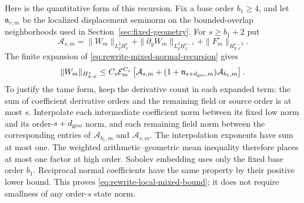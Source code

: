 Here is the quantitative form of this recursion. Fix a base order
$b_1\ge4$, and let $\mathfrak n_{r,m}$ be the localized displacement
seminorm on the bounded-overlap neighborhoods used in
Section~\ref{sec:fixed-geometry}. For $s\ge b_1+2$ put
\[
 \mathcal A_{s,m}
 =\|W_m\|_{L_y^2H_\varphi^s}
   +\|\partial_yW_m\|_{L_y^2H_\varphi^{s-1}}
   +\|F_m^\circ\|_{H^{s-2}_{y,\varphi}}.
\]
The finite expansion of \eqref{eq:rewrite-mixed-normal-recursion}
gives
\begin{equation}\label{eq:rewrite-local-mixed-bound}
 \|W_m\|_{H^s_{y,\varphi}}
 \le C_s\mathcal E_m^{C_s}
       \left[\mathcal A_{s,m}
       +(1+\mathfrak n_{s+d_{\rm geo},m})\mathcal A_{b_1,m}\right].
\end{equation}
To justify the tame form, keep the derivative count in each
expanded term: the sum of coefficient derivative orders and the
remaining field or source order is at most $s$. Interpolate each
intermediate coefficient norm between its fixed low norm and its
order-$s+d_{\rm geo}$ norm, and each remaining field norm between
the corresponding entries of $\mathcal A_{b_1,m}$ and
$\mathcal A_{s,m}$. The interpolation exponents have sum at most
one. The weighted arithmetic--geometric mean inequality therefore
places at most one factor at high order. Sobolev embedding uses only
the fixed base order $b_1$. Reciprocal normal coefficients have the
same property by their positive lower bound. This proves
\eqref{eq:rewrite-local-mixed-bound}; it does not require smallness
of any order-$s$ state norm.

